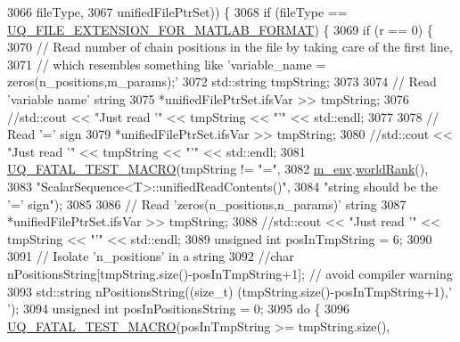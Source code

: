 \begin{DoxyCode}
3066                                        fileType,
3067                                        unifiedFilePtrSet)) \{
3068           \textcolor{keywordflow}{if} (fileType == \hyperlink{_defines_8h_ac440026eff7deb1c1eed1eea0e8e36ba}{UQ\_FILE\_EXTENSION\_FOR\_MATLAB\_FORMAT}) \{
3069             \textcolor{keywordflow}{if} (r == 0) \{
3070               \textcolor{comment}{// Read number of chain positions in the file by taking care of the first line,}
3071               \textcolor{comment}{// which resembles something like 'variable\_name = zeros(n\_positions,m\_params);'}
3072         std::string tmpString;
3073 
3074               \textcolor{comment}{// Read 'variable name' string}
3075               *unifiedFilePtrSet.ifsVar >> tmpString;
3076         \textcolor{comment}{//std::cout << "Just read '" << tmpString << "'" << std::endl;}
3077 
3078               \textcolor{comment}{// Read '=' sign}
3079               *unifiedFilePtrSet.ifsVar >> tmpString;
3080           \textcolor{comment}{//std::cout << "Just read '" << tmpString << "'" << std::endl;}
3081               \hyperlink{_defines_8h_a56d63d18d0a6d45757de47fcc06f574d}{UQ\_FATAL\_TEST\_MACRO}(tmpString != \textcolor{stringliteral}{"="},
3082                                   \hyperlink{class_q_u_e_s_o_1_1_scalar_sequence_a71618cd6351b29361b437af68447a4c8}{m\_env}.\hyperlink{class_q_u_e_s_o_1_1_base_environment_a78b57112bbd0e6dd0e8afec00b40ffa7}{worldRank}(),
3083                                   \textcolor{stringliteral}{"ScalarSequence<T>::unifiedReadContents()"},
3084                                   \textcolor{stringliteral}{"string should be the '=' sign"});
3085 
3086               \textcolor{comment}{// Read 'zeros(n\_positions,n\_params)' string}
3087               *unifiedFilePtrSet.ifsVar >> tmpString;
3088         \textcolor{comment}{//std::cout << "Just read '" << tmpString << "'" << std::endl;}
3089               \textcolor{keywordtype}{unsigned} \textcolor{keywordtype}{int} posInTmpString = 6;
3090 
3091               \textcolor{comment}{// Isolate 'n\_positions' in a string}
3092               \textcolor{comment}{//char nPositionsString[tmpString.size()-posInTmpString+1]; // avoid compiler warning}
3093         std::string nPositionsString((\textcolor{keywordtype}{size\_t}) (tmpString.size()-posInTmpString+1),\textcolor{charliteral}{' '});
3094               \textcolor{keywordtype}{unsigned} \textcolor{keywordtype}{int} posInPositionsString = 0;
3095               \textcolor{keywordflow}{do} \{
3096                 \hyperlink{_defines_8h_a56d63d18d0a6d45757de47fcc06f574d}{UQ\_FATAL\_TEST\_MACRO}(posInTmpString >= tmpString.size(),

\end{DoxyCode}
